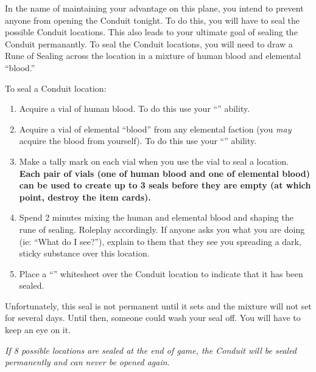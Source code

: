 \documentclass[green]{elementals}
\begin{document}
\name{\gSealingLocations{}}

In the name of maintaining your advantage on this plane, you intend to prevent anyone from opening the Conduit tonight.  To do this, you will have to seal the possible Conduit locations. This also leads to your ultimate goal of sealing the Conduit permanantly. To seal the Conduit locations, you will need to draw a Rune of Sealing across the location in a mixture of human blood and elemental ``blood.''

To seal a Conduit location:
\begin{enumerate}
  \item Acquire a vial of human blood. To do this use your ``\aDrawBlood{}'' ability.
  \item Acquire a vial of elemental ``blood'' from any elemental faction (you \emph{may} acquire the blood from yourself). To do this use your ``\aDrawBlood{}'' ability.
  \item Make a tally mark on each vial when you use the vial to seal a location. {\bf Each pair of vials (one of human blood and one of elemental blood) can be used to create up to 3 seals before they are empty (at which point, destroy the item cards).}
  \item Spend 2 minutes mixing the human and elemental blood and shaping the rune of sealing. Roleplay accordingly.  If anyone asks you what you are doing (ie: ``What do I see?''), explain to them that they see you spreading a dark, sticky substance over this location.
  \item Place a ``\wSealedConduit{}'' whitesheet over the Conduit location to indicate that it has been sealed.
\end{enumerate}

Unfortunately, this seal is not permanent until it sets and the mixture will not set for several days. Until then, someone could wash your seal off. You will have to keep an eye on it.

{\large \emph{If 8 possible locations are sealed at the end of game, the Conduit will be sealed permanently and can never be opened again.}}
\end{document}
